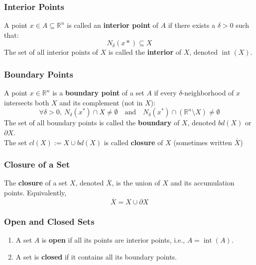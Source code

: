 \documentclass{article}
\begin{document}
\subsubsection{Interior Points}
A point $x \in A \subseteq \mathbb{R}^n$ is called an \textbf{interior point} of $A$ if there exists a $\delta > 0$ such that:
\[
N_{\delta} (x*) \subseteq X
\]
The set of all interior points of $X$ is called the \textbf{interior} of $X$, denoted $\operatorname{int}(X)$.

\subsubsection{Boundary Points}
A point $x \in \mathbb{R}^n$ is a \textbf{boundary point} of a set $A$ if every $\delta$-neighborhood of $x$ intersects both $X$ and its complement (not in $X$):
\[
\forall \delta > 0,\ N_\delta(x^{*}) \cap X \neq \emptyset \quad \text{and} \quad N_\delta(x^{*}) \cap (\mathbb{R}^n \setminus X) \neq \emptyset
\]
The set of all boundary points is called the \textbf{boundary} of $X$, denoted $bd(X)$ or $\partial X$.
\\ 
The set $cl(X) := X \cup bd(X)$ is called \textbf{closure} of $X$ (sometimes written $\bar{X}$)
\subsubsection{Closure of a Set}
The \textbf{closure} of a set $X$, denoted $\overline{X}$, is the union of $X$ and its accumulation points. Equivalently,
\[
\overline{X} = X \cup \partial X
\]
\subsubsection{Open and Closed Sets}
\begin{enumerate} \item A set $A$ is \textbf{open} if all its points are interior points, i.e., $A = \operatorname{int}(A)$.
\item A set is \textbf{closed} if it contains all its boundary points.
\end{enumerate}
\end{document}
